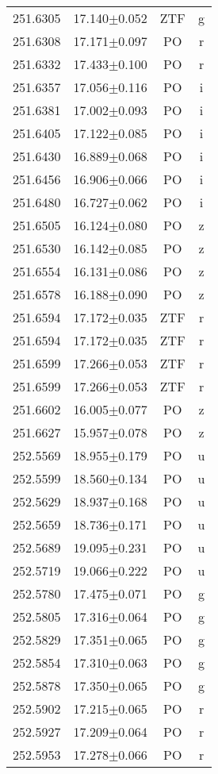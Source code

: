 \begin{table}
\begin{tabular}{cccc}
251.6305 & 17.140$\pm$0.052 & ZTF & g \\
251.6308 & 17.171$\pm$0.097 & PO & r \\
251.6332 & 17.433$\pm$0.100 & PO & r \\
251.6357 & 17.056$\pm$0.116 & PO & i \\
251.6381 & 17.002$\pm$0.093 & PO & i \\
251.6405 & 17.122$\pm$0.085 & PO & i \\
251.6430 & 16.889$\pm$0.068 & PO & i \\
251.6456 & 16.906$\pm$0.066 & PO & i \\
251.6480 & 16.727$\pm$0.062 & PO & i \\
251.6505 & 16.124$\pm$0.080 & PO & z \\
251.6530 & 16.142$\pm$0.085 & PO & z \\
251.6554 & 16.131$\pm$0.086 & PO & z \\
251.6578 & 16.188$\pm$0.090 & PO & z \\
251.6594 & 17.172$\pm$0.035 & ZTF & r \\
251.6594 & 17.172$\pm$0.035 & ZTF & r \\
251.6599 & 17.266$\pm$0.053 & ZTF & r \\
251.6599 & 17.266$\pm$0.053 & ZTF & r \\
251.6602 & 16.005$\pm$0.077 & PO & z \\
251.6627 & 15.957$\pm$0.078 & PO & z \\
252.5569 & 18.955$\pm$0.179 & PO & u \\
252.5599 & 18.560$\pm$0.134 & PO & u \\
252.5629 & 18.937$\pm$0.168 & PO & u \\
252.5659 & 18.736$\pm$0.171 & PO & u \\
252.5689 & 19.095$\pm$0.231 & PO & u \\
252.5719 & 19.066$\pm$0.222 & PO & u \\
252.5780 & 17.475$\pm$0.071 & PO & g \\
252.5805 & 17.316$\pm$0.064 & PO & g \\
252.5829 & 17.351$\pm$0.065 & PO & g \\
252.5854 & 17.310$\pm$0.063 & PO & g \\
252.5878 & 17.350$\pm$0.065 & PO & g \\
252.5902 & 17.215$\pm$0.065 & PO & r \\
252.5927 & 17.209$\pm$0.064 & PO & r \\
252.5953 & 17.278$\pm$0.066 & PO & r \\

\end{tabular}
\end{table}

